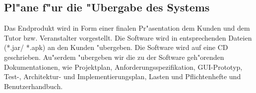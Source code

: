 \documentclass[fontsize=12pt,paper=a4,twoside]{scrartcl}
\begin{document}
\subsection{Pl"ane f"ur die "Ubergabe des Systems}
Das Endprodukt wird in Form einer finalen Pr"asentation dem Kunden und dem Tutor bzw. Veranstalter vorgestellt.
Die Software wird in entsprechenden Dateien (*.jar/ *.apk) an den Kunden "ubergeben. Die Software wird auf eine CD geschrieben. Au"serdem "ubergeben wir die zu der Software geh"orenden Dokumentationen, wie Projektplan, Anforderungsspezifikation, GUI-Prototyp, Test-, Architektur- und Implementierungsplan, Lasten und Pflichtenhefte und Benutzerhandbuch.
\end{document}
